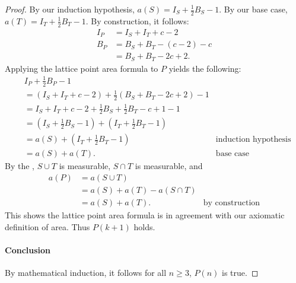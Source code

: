 \documentclass{report}
\begin{document}
\begin{proof}
      By our induction hypothesis, $a(S) = I_S + \frac{1}{2}B_S - 1$.
      By our base case, $a(T) = I_T + \frac{1}{2}B_T - 1$.
      By construction, it follows:
        \begin{align*}
          I_P & = I_S + I_T + c - 2 \\
          B_P & = B_S + B_T - (c - 2) - c \\
              & = B_S + B_T - 2c + 2.
        \end{align*}
      Applying the lattice point area formula to $P$ yields the following:
        \begin{align*}
          & I_P + \frac{1}{2}B_P - 1 \\
            & = (I_S + I_T + c - 2) + \frac{1}{2}(B_S + B_T - 2c + 2) - 1 \\
            & = I_S + I_T + c - 2 + \frac{1}{2}B_S + \frac{1}{2}B_T - c + 1 - 1 \\
            & = (I_S + \frac{1}{2}B_S - 1) + (I_T + \frac{1}{2}B_T - 1) \\
            & = a(S) + (I_T + \frac{1}{2}B_T - 1) & \text{induction hypothesis} \\
            & = a(S) + a(T). & \text{base case}
        \end{align*}
      By the , $S \cup T$ is measurable,
        $S \cap T$ is measurable, and
        \begin{align*}
          a(P)
            & = a(S \cup T) \\
            & = a(S) + a(T) - a(S \cap T) \\
            & = a(S) + a(T). & \text{by construction}
        \end{align*}
      This shows the lattice point area formula is in agreement with our
        axiomatic definition of area.
      Thus $P(k + 1)$ holds.

    \paragraph{Conclusion}%

      By mathematical induction, it follows for all $n \geq 3$, $P(n)$ is true.

  \end{proof}

\subsection{}%
\end{document}
